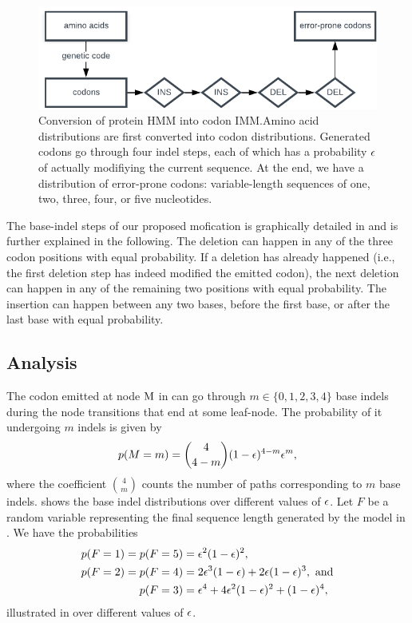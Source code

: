 \begin{figure}[htbp]
  \centering
  \captionsetup{width=.6\linewidth}
  \includegraphics[width=.6\linewidth]{figure/hmm-to-imm}
  \caption{Conversion of protein HMM into codon IMM.\@ Amino acid distributions are first converted
  into codon distributions. Generated codons go through four indel steps, each of which has a
  probability $\epsilon$ of actually modifiying the current sequence. At the end, we have a distribution
  of error-prone codons: variable-length sequences of one, two, three, four, or five
  nucleotides.}\label{fig:hmm-to-imm}
\end{figure}

The base-indel steps of our proposed mofication is graphically detailed in 
and is further explained in the following. The deletion can happen in any of the three codon
positions with equal probability. If a deletion has already happened (i.e., the first deletion step
has indeed modified the emitted codon), the next deletion can happen in any of the remaining two
positions with equal probability. The insertion can happen between any two bases, before the first
base, or after the last base with equal probability.

\subsection{Analysis}

The codon emitted at node $\mathrm{M}$ in  can go through $m\in\{0, 1, 2, 3,
4\}$ base indels during the node transitions that end at some leaf-node. The probability of
it undergoing $m$ indels is given by
\begin{equation*}
  p(M=m) = \binom{4}{4-m} (1 - \epsilon)^{4-m} \epsilon^m,
\end{equation*}
where the coefficient $\binom{4}{m}$ counts the number of paths corresponding to $m$ base indels.
 shows the base indel distributions over different values of $\epsilon$.
Let $F$ be a random variable representing the final sequence length generated by the model in
.
We have the probabilities
\begin{equation*}
  \begin{split}
    p(F=1) = p(F=5) &= \epsilon^2(1-\epsilon)^2, \\
    p(F=2) = p(F=4) &= 2\epsilon^3(1-\epsilon) + 2\epsilon(1-\epsilon)^3,~\text{and} \\
    p(F=3)          &= \epsilon^4 + 4\epsilon^2(1-\epsilon)^2 + (1-\epsilon)^4,
  \end{split}
\end{equation*}
illustrated in  over different values of $\epsilon$.

